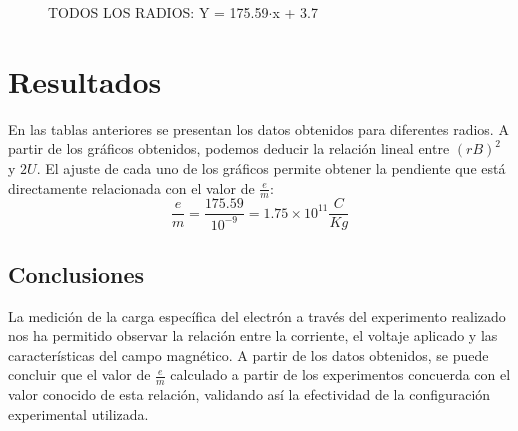 \documentclass[a4paper,12pt]{report}
\begin{document}
\begin{figure}[b]
\centering
\captionsetup{labelformat=empty} %
\caption*{TODOS LOS RADIOS: Y = 175.59$\cdot$x + 3.7 }
\end{figure}

\vspace{5cm}

\chapter{Resultados}

    En las tablas anteriores se presentan los datos obtenidos para diferentes radios. A partir de los gráficos 
    obtenidos, podemos deducir la relación lineal entre $ (rB)^2 $ y $ 2U $. 
    El ajuste de cada uno de los gráficos permite obtener la pendiente que está directamente relacionada con el valor
    de $\frac{e}{m}$:
    \begin{equation*}
        \frac{e}{m} = \frac{175.59}{10^{-9}} = 1.75 \times 10^{11} \frac{C}{Kg}
    \end{equation*}

\section{Conclusiones}

    La medición de la carga específica del electrón a través del experimento realizado nos ha permitido observar la relación entre la corriente, el voltaje aplicado y las características del campo magnético. A partir de los datos obtenidos, se puede concluir que el valor de $ \frac{e}{m} $ calculado a partir de los experimentos concuerda con el valor conocido de esta relación, validando así la efectividad de la configuración experimental utilizada.
\end{document}
